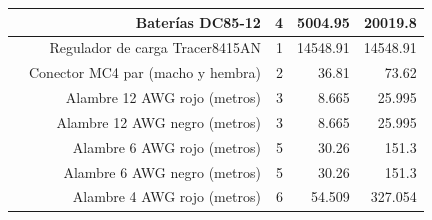 \begin{landscape}
\begin{longtable}{|r|r|r|l|r|}
    
    \hline
    \rowcolor[rgb]{ .851,  .851,  .851} \multicolumn{1}{|c|}{\multirow{27}[54]{*}{Energético}} & \multicolumn{1}{p{16.43em}|}{\cellcolor[rgb]{ 1,  1,  1}Baterías DC85-12} & \cellcolor[rgb]{ 1,  1,  1}4 & \multicolumn{1}{r|}{\cellcolor[rgb]{ 1,  1,  1}5004.95} & \cellcolor[rgb]{ 1,  1,  1}20019.8 \\
    \hline
\cmidrule{Energético}    \rowcolor[rgb]{ .851,  .851,  .851}       & \multicolumn{1}{p{16.43em}|}{\cellcolor[rgb]{ 1,  1,  1}Regulador de carga Tracer8415AN} & \cellcolor[rgb]{ 1,  1,  1}1 & \multicolumn{1}{r|}{\cellcolor[rgb]{ 1,  1,  1}14548.91} & \cellcolor[rgb]{ 1,  1,  1}14548.91 \\
\hline
\cmidrule{Energético}    \rowcolor[rgb]{ .851,  .851,  .851}       & \multicolumn{1}{p{16.43em}|}{\cellcolor[rgb]{ 1,  1,  1}Conector MC4 par (macho y hembra)} & \cellcolor[rgb]{ 1,  1,  1}2 & \multicolumn{1}{r|}{\cellcolor[rgb]{ 1,  1,  1}36.81} & \cellcolor[rgb]{ 1,  1,  1}73.62 \\
\hline
\cmidrule{Energético}    \rowcolor[rgb]{ .851,  .851,  .851}       & \multicolumn{1}{p{16.43em}|}{\cellcolor[rgb]{ 1,  1,  1}Alambre 12 AWG rojo (metros)} & \cellcolor[rgb]{ 1,  1,  1}3 & \multicolumn{1}{r|}{\cellcolor[rgb]{ 1,  1,  1}8.665} & \cellcolor[rgb]{ 1,  1,  1}25.995 \\
\hline
\cmidrule{Energético}    \rowcolor[rgb]{ .851,  .851,  .851}       & \multicolumn{1}{p{16.43em}|}{\cellcolor[rgb]{ 1,  1,  1}Alambre 12 AWG negro (metros)} & \cellcolor[rgb]{ 1,  1,  1}3 & \multicolumn{1}{r|}{\cellcolor[rgb]{ 1,  1,  1}8.665} & \cellcolor[rgb]{ 1,  1,  1}25.995 \\
\hline
\cmidrule{Energético}    \rowcolor[rgb]{ .851,  .851,  .851}       & \multicolumn{1}{p{16.43em}|}{\cellcolor[rgb]{ 1,  1,  1}Alambre 6 AWG rojo (metros)} & \cellcolor[rgb]{ 1,  1,  1}5 & \multicolumn{1}{r|}{\cellcolor[rgb]{ 1,  1,  1}30.26} & \cellcolor[rgb]{ 1,  1,  1}151.3 \\
\hline
\cmidrule{Energético}    \rowcolor[rgb]{ .851,  .851,  .851}       & \multicolumn{1}{p{16.43em}|}{\cellcolor[rgb]{ 1,  1,  1}Alambre 6 AWG negro (metros)} & \cellcolor[rgb]{ 1,  1,  1}5 & \multicolumn{1}{r|}{\cellcolor[rgb]{ 1,  1,  1}30.26} & \cellcolor[rgb]{ 1,  1,  1}151.3 \\
\hline
\cmidrule{Energético}    \rowcolor[rgb]{ .851,  .851,  .851}       & \multicolumn{1}{p{16.43em}|}{\cellcolor[rgb]{ 1,  1,  1}Alambre 4 AWG rojo (metros)} & \cellcolor[rgb]{ 1,  1,  1}6 & \multicolumn{1}{r|}{\cellcolor[rgb]{ 1,  1,  1}54.509} & \cellcolor[rgb]{ 1,  1,  1}327.054 \\

\end{longtable}
\end{landscape}
